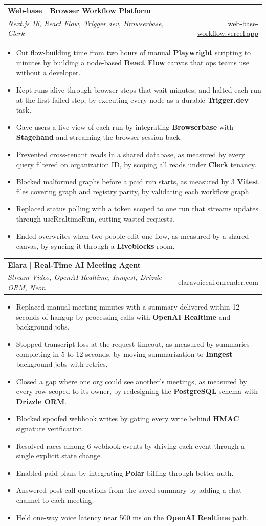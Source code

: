 \documentclass[letterpaper,10pt]{article}
\makeatletter
\newcommand{\bi}[1]{\item{\small #1}}
\newcommand{\row}[4]{\begin{tabular*}{\textwidth}[t]{l@{\extracolsep{\fill}}r}
\textbf{#1} & \small #2 \\ \textit{\small #3} & \small #4 \\ \end{tabular*}\vspace{0pt}}
\newcommand{\bstart}{\begin{itemize}[leftmargin=0.16in,itemsep=0.8pt,parsep=0pt,topsep=1pt,label=\textbullet]}
\newcommand{\bend}{\end{itemize}\vspace{1pt}}
\makeatother
\begin{document}
\row{Web-base $|$ Browser Workflow Platform}{}{Next.js 16, React Flow, Trigger.dev, Browserbase, Clerk}{\href{https://web-base-workflow.vercel.app/}{\underline{web-base-workflow.vercel.app}}}
\bstart
\bi{Cut flow-building time from two hours of manual \textbf{Playwright} scripting to minutes by building a node-based \textbf{React Flow} canvas that ops teams use without a developer.}
\bi{Kept runs alive through browser steps that wait minutes, and halted each run at the first failed step, by executing every node as a durable \textbf{Trigger.dev} task.}
\bi{Gave users a live view of each run by integrating \textbf{Browserbase} with \textbf{Stagehand} and streaming the browser session back.}
\bi{Prevented cross-tenant reads in a shared database, as measured by every query filtered on organization ID, by scoping all reads under \textbf{Clerk} tenancy.}
\bi{Blocked malformed graphs before a paid run starts, as measured by 3 \textbf{Vitest} files covering graph and registry parity, by validating each workflow graph.}
\bi{Replaced status polling with a token scoped to one run that streams updates through useRealtimeRun, cutting wasted requests.}
\bi{Ended overwrites when two people edit one flow, as measured by a shared canvas, by syncing it through a \textbf{Liveblocks} room.}
\bend

\row{Elara $|$ Real-Time AI Meeting Agent}{}{Stream Video, OpenAI Realtime, Inngest, Drizzle ORM, Neon}{\href{https://elaravoiceai.onrender.com}{\underline{elaravoiceai.onrender.com}}}
\bstart
\bi{Replaced manual meeting minutes with a summary delivered within 12 seconds of hangup by processing calls with \textbf{OpenAI Realtime} and background jobs.}
\bi{Stopped transcript loss at the request timeout, as measured by summaries completing in 5 to 12 seconds, by moving summarization to \textbf{Inngest} background jobs with retries.}
\bi{Closed a gap where one org could see another's meetings, as measured by every row scoped to its owner, by redesigning the \textbf{PostgreSQL} schema with \textbf{Drizzle ORM}.}
\bi{Blocked spoofed webhook writes by gating every write behind \textbf{HMAC} signature verification.}
\bi{Resolved races among 6 webhook events by driving each event through a single explicit state change.}
\bi{Enabled paid plans by integrating \textbf{Polar} billing through better-auth.}
\bi{Answered post-call questions from the saved summary by adding a chat channel to each meeting.}
\bi{Held one-way voice latency near 500 ms on the \textbf{OpenAI Realtime} path.}
\bend
\end{document}

